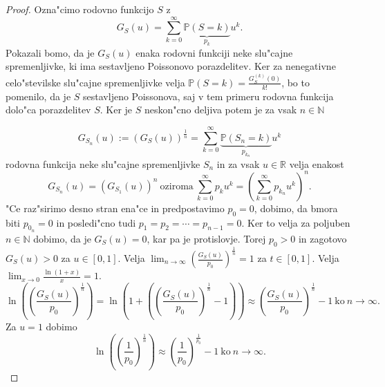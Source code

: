\documentclass[12pt, a4paper, reqno]{amsart}
\theoremstyle{definition}
\theoremstyle{plain}
\newcommand{\R}{\mathbb{R}}
\newcommand{\N}{\mathbb{N}}
\newcommand{\Prob}{\mathbb{P}}
\newcommand{\1}{\mathds{1}}
\begin{document}
    \begin{proof}
        Ozna"cimo rodovno funkcijo $S$ z 
        \begin{equation*}
            G_S(u) = \sum_{k = 0}^\infty \underbrace{\Prob\left(S = k\right)}_{p_k}u^k.
        \end{equation*} 
        Pokazali bomo, da je $G_S(u)$ enaka rodovni funkciji neke slu"cajne spremenljivke, ki ima sestavljeno
        Poissonovo porazdelitev. Ker za nenegativne celo"stevilske slu"cajne spremenljivke velja 
        $\Prob\left(S = k\right) = \frac{G_S^{(k)}(0)}{k!}$, bo to pomenilo, da je $S$ sestavljeno Poissonova, 
        saj v tem primeru rodovna funkcija dolo"ca porazdelitev $S$.
        Ker je $S$ neskon"cno deljiva potem je za vsak $n\in\N$ 

        \begin{equation*}
            G_{S_n}(u) := \left(G_S(u)\right)^{\frac{1}{n}} = 
            \sum_{k = 0}^\infty\underbrace{\Prob\left(S_n = k\right)}_{p_{k_n}}u^k
        \end{equation*}
        rodovna funkcija neke slu"cajne spremenljivke $S_n$ in za vsak $u\in\R$ velja enakost
        \begin{equation*}
            G_{S_n}(u) = \left(G_{S_1}(u)\right)^n \ \text{oziroma} \ 
            \sum_{k = 0}^\infty p_{k}u^k = \left(\sum_{k = 0}^\infty p_{k_n}u^k\right)^n.
        \end{equation*}
        "Ce raz"sirimo desno stran ena"ce in predpostavimo $p_0 = 0$, dobimo, da bmora biti 
        $p_{0_n} = 0$ in posledi"cno tudi $p_1 = p_2 = \cdots = p_{n-1} = 0$. Ker to velja za poljuben 
        $n\in\N$ dobimo, da je $G_S(u) = 0$, kar pa je protislovje. Torej $p_0 > 0$ in zagotovo 
        $G_S(u) > 0$ za $u\in[0, 1]$. Velja $\lim_{n\to\infty}\left(\frac{G_S(u)}{p_0}\right)^{\frac{1}{n}} = 1$ za $t\in[0, 1]$.
        Velja $\lim_{x \to 0}\frac{\ln(1 + x)}{x} = 1.$
        \begin{equation*}
            \ln\left(\left(\frac{G_S(u)}{p_0}\right)^{\frac{1}{n}}\right) = \ln\left( 1 + \left(\left(\frac{G_S(u)}{p_0}\right)^{\frac{1}{n}} - 1\right)\right)
            \approx \left(\frac{G_S(u)}{p_0}\right)^{\frac{1}{n}} - 1 \ \text{ko} \ n\to\infty.
        \end{equation*}
        Za $u = 1$ dobimo
        \begin{equation*}
            \ln\left(\left(\frac{1}{p_0}\right)^{\frac{1}{n}}\right) \approx \left(\frac{1}{p_0}\right)^{\frac{1}{p_0}} - 1 \ \text{ko} \ n\to\infty.
        \end{equation*}



        

    \end{proof}
\end{document}
